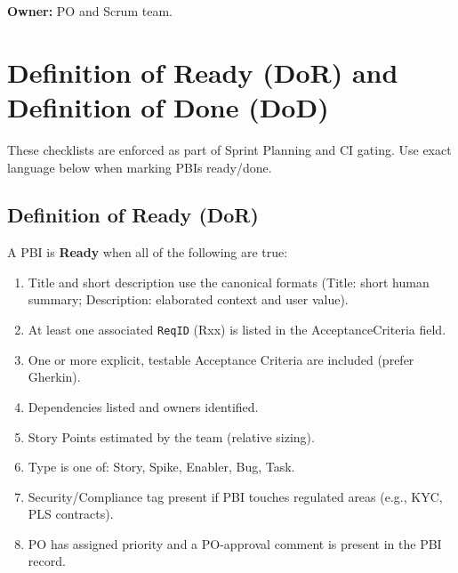 \documentclass[11pt,a4paper]{article}
\begin{document}
\textbf{Owner:} PO and Scrum team.

\section{Definition of Ready (DoR) and Definition of Done (DoD)}\label{sec:dor_dod}
These checklists are enforced as part of Sprint Planning and CI gating. Use exact language below when marking PBIs ready/done.

\subsection{Definition of Ready (DoR)}
A PBI is \textbf{Ready} when all of the following are true:
\begin{enumerate}[leftmargin=*]
  \item Title and short description use the canonical formats (Title: short human summary; Description: elaborated context and user value).
  \item At least one associated \texttt{ReqID} (Rxx) is listed in the AcceptanceCriteria field.
  \item One or more explicit, testable Acceptance Criteria are included (prefer Gherkin).
  \item Dependencies listed and owners identified.
  \item Story Points estimated by the team (relative sizing).
  \item Type is one of: Story, Spike, Enabler, Bug, Task.
  \item Security/Compliance tag present if PBI touches regulated areas (e.g., KYC, PLS contracts).
  \item PO has assigned priority and a PO-approval comment is present in the PBI record.
\end{enumerate}
\end{document}
